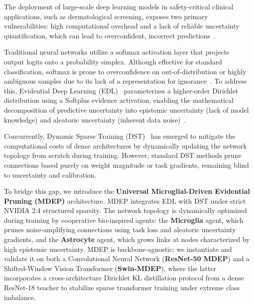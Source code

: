 \documentclass[letterpaper]{article} %
\begin{document}
The deployment of large-scale deep learning models in safety-critical clinical applications, such as dermatological screening, exposes two primary vulnerabilities: high computational overhead and a lack of reliable uncertainty quantification, which can lead to overconfident, incorrect predictions~\cite{he2016deep, dosovitskiy2021image, esteva2017dermatologist, guo2017calibration}. 

Traditional neural networks utilize a softmax activation layer that projects output logits onto a probability simplex. Although effective for standard classification, softmax is prone to overconfidence on out-of-distribution or highly ambiguous samples due to its lack of a representation for ignorance~\cite{lakshminarayanan2017simple, guo2017calibration}. To address this, Evidential Deep Learning (EDL)~\cite{sensoy2018evidential} parameterizes a higher-order Dirichlet distribution using a Softplus evidence activation, enabling the mathematical decomposition of predictive uncertainty into epistemic uncertainty (lack of model knowledge) and aleatoric uncertainty (inherent data noise)~\cite{sensoy2018evidential, malinin2018predictive}.

Concurrently, Dynamic Sparse Training (DST)~\cite{evci2020rigging, mocanu2018scalable} has emerged to mitigate the computational costs of dense architectures by dynamically updating the network topology from scratch during training. However, standard DST methods prune connections based purely on weight magnitude or task gradients, remaining blind to uncertainty and calibration.

To bridge this gap, we introduce the \textbf{Universal Microglial-Driven Evidential Pruning (MDEP)} architecture. MDEP integrates EDL with DST under strict NVIDIA 2:4 structured sparsity. The network topology is dynamically optimized during training by cooperative bio-inspired agents: the \textbf{Microglia} agent, which prunes noise-amplifying connections using task loss and aleatoric uncertainty gradients, and the \textbf{Astrocyte} agent, which grows links at nodes characterized by high epistemic uncertainty. MDEP is backbone-agnostic; we instantiate and validate it on both a Convolutional Neural Network (\textbf{ResNet-50 MDEP}) and a Shifted-Window Vision Transformer (\textbf{Swin-MDEP}), where the latter incorporates a cross-architecture Dirichlet KL distillation protocol from a dense ResNet-18 teacher to stabilize sparse transformer training under extreme class imbalance.
\end{document}

